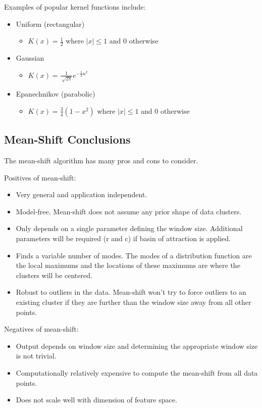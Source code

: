 \documentclass{article}
\begin{document}
Examples of popular kernel functions include:
\begin{itemize}
	\item Uniform (rectangular)
		\begin{itemize}
		\item $K(x)=\frac{1}{2}$ where $|x|\le1$ and 0 otherwise
		\end{itemize}
	\item Gaussian
		\begin{itemize}
		\item $K(x)=\frac{1}{\sqrt[]{2\pi}}e^{-\frac{1}{2}u^2}$
		\end{itemize}
	\item Epanechnikov (parabolic)
		\begin{itemize}
		\item $K(x)=\frac{3}{4}(1-x^2)$ where $|x|\le1$ and 0 otherwise
		\end{itemize}
\end{itemize}

\subsection{Mean-Shift Conclusions}

The mean-shift algorithm has many pros and cons to consider.

Positives of mean-shift:
\begin{itemize}
\item Very general and application independent. 
\item Model-free. Mean-shift does not assume any prior shape of data clusters.
\item Only depends on a single parameter defining the window size. Additional parameters will be required (r and c) if basin of attraction is applied.
\item Finds a variable number of modes. The modes of a distribution function are the local maximums and the locations of these maximums are where the clusters will be centered.
\item Robust to outliers in the data. Mean-shift won't try to force outliers to an existing cluster if they are further than the window size away from all other points.
\end{itemize}

Negatives of mean-shift:
\begin{itemize}
\item Output depends on window size and determining the appropriate window size is not trivial.
\item Computationally relatively expensive to compute the mean-shift from all data points.
\item Does not scale well with dimension of feature space.
\end{itemize}
\end{document}
